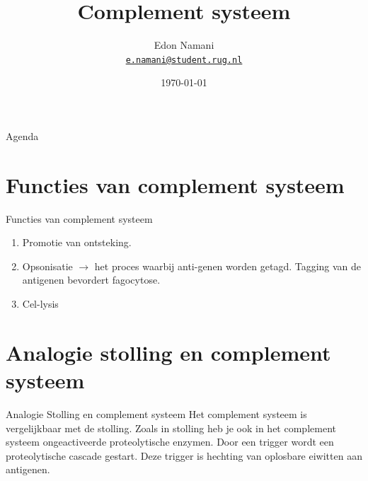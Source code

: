 \documentclass{beamer}
\title[Immunologie]{Complement systeem}
\date{\today}
\author[Edon Namani, et. al]
{%
	Edon Namani\\
	\href{mailto:e.namani@student.rug.nl}{{\tt e.namani@student.rug.nl}}
}
\institute[%
	Faculteit Gezondheidswetenschappen\\
	Rijksuniversiteit Groningen\\
	Nederland
]
{%
	Faculteit Gezondheidswetenschappen\\
	Rijksuniversiteit Groningen\\
	Nederland

}
\begin{document}
{\aauwavesbg%
	\begin{frame}
	\titlepage
\end{frame}}

\begin{frame}{Agenda}{}
	\tableofcontents
\end{frame}
\section{Functies van complement systeem}
\begin{frame}{Functies van complement systeem}
	\begin{enumerate}
		\item Promotie van ontsteking.
		\item Opsonisatie $\rightarrow$ het proces waarbij anti-genen worden getagd. Tagging van de antigenen bevordert fagocytose.
		\item Cel-lysis
	\end{enumerate}
\end{frame}

\section{Analogie stolling en complement systeem}
\begin{frame}
	\begin{block}{Analogie Stolling en complement systeem}
		Het complement systeem is vergelijkbaar met de stolling. Zoals in stolling heb je ook in het complement systeem ongeactiveerde proteolytische enzymen. Door een trigger wordt een proteolytische cascade gestart. Deze trigger is hechting van oplosbare eiwitten aan antigenen.
	\end{block}
\end{frame}
\end{document}
